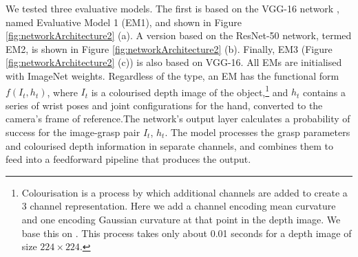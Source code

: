 We tested three evaluative models. The first is based on the VGG-16 network \cite{Simonyan14c}, named Evaluative Model 1 (EM1), and shown in Figure \ref{fig:networkArchitecture2} (a). A version based on the ResNet-50 network, termed EM2, is shown in Figure \ref{fig:networkArchitecture2} (b). Finally, EM3 (Figure \ref{fig:networkArchitecture2} (c)) is also based on VGG-16. All EMs are initialised with ImageNet weights. Regardless of the type, an EM has the functional form $f(I_t, h_t)$, where $I_t$ is a colourised depth image of the object,\footnote{Colourisation is a process by which additional channels are added to create a 3 channel representation. Here we add a channel encoding mean curvature and one encoding Gaussian curvature at that point in the depth image. We base this on \cite{kopicki2015ijrr}. This process takes only about 0.01 seconds for a depth image of size $224 \times 224$.} and $h_t$ contains a series of wrist poses and joint configurations for the hand, converted to the camera's frame of reference.The network's output layer calculates a probability of success for the image-grasp pair $I_t$, $h_t$. The model processes the grasp parameters and colourised depth information in separate channels, and combines them to feed into a feedforward pipeline that produces the output.
